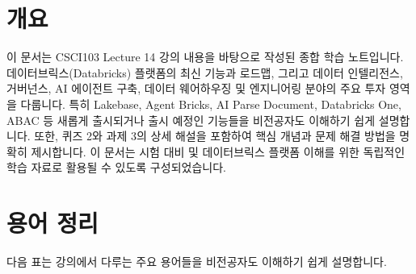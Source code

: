 \documentclass[11pt,a4paper]{article}
\begin{document}
\newpage
\section*{개요}

이 문서는 CSCI103 Lecture 14 강의 내용을 바탕으로 작성된 종합 학습 노트입니다.
데이터브릭스(Databricks) 플랫폼의 최신 기능과 로드맵, 그리고 데이터 인텔리전스, 거버넌스, AI 에이전트 구축, 데이터 웨어하우징 및 엔지니어링 분야의 주요 투자 영역을 다룹니다.
특히 Lakebase, Agent Bricks, AI Parse Document, Databricks One, ABAC 등 새롭게 출시되거나 출시 예정인 기능들을 비전공자도 이해하기 쉽게 설명합니다.
또한, 퀴즈 2와 과제 3의 상세 해설을 포함하여 핵심 개념과 문제 해결 방법을 명확히 제시합니다.
이 문서는 시험 대비 및 데이터브릭스 플랫폼 이해를 위한 독립적인 학습 자료로 활용될 수 있도록 구성되었습니다.

\newpage
\section*{용어 정리}

다음 표는 강의에서 다루는 주요 용어들을 비전공자도 이해하기 쉽게 설명합니다.
\end{document}
